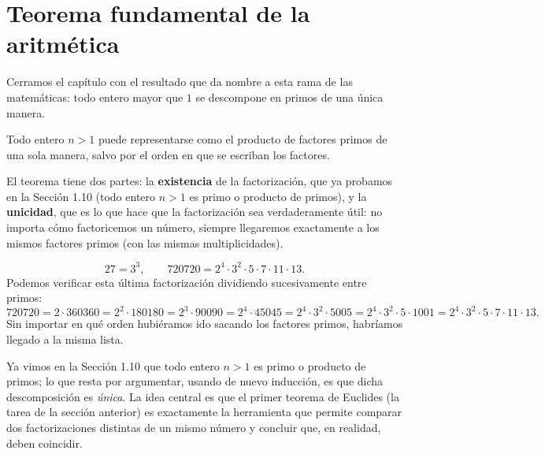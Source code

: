 \documentclass[12pt,a4paper]{book}
\begin{document}
  \section{Teorema fundamental de la aritmética}
  
  Cerramos el capítulo con el resultado que da nombre a esta rama de las matemáticas: todo entero mayor que $1$ se descompone en primos de una única manera.
  
  \begin{teorema}
    Todo entero $n>1$ puede representarse como el producto de factores primos de una sola manera, salvo por el orden en que se escriban los factores.
  \end{teorema}
  
  El teorema tiene dos partes: la \textbf{existencia} de la factorización, que ya probamos en la Sección 1.10 (todo entero $n>1$ es primo o producto de primos), y la \textbf{unicidad}, que es lo que hace que la factorización sea verdaderamente útil: no importa cómo factoricemos un número, siempre llegaremos exactamente a los mismos factores primos (con las mismas multiplicidades).
  
  \begin{ejemplo}
    \begin{equation*}
      27 = 3^3, \qquad 720720 = 2^4\cdot 3^2\cdot 5\cdot 7\cdot 11\cdot 13.
    \end{equation*}
    Podemos verificar esta última factorización dividiendo sucesivamente entre primos:
    \begin{equation*}
      720720 = 2\cdot 360360 = 2^2\cdot 180180 = 2^3\cdot 90090 = 2^4\cdot 45045 = 2^4\cdot 3^2\cdot 5005 = 2^4\cdot 3^2\cdot 5\cdot 1001 = 2^4\cdot 3^2\cdot 5\cdot 7\cdot 11\cdot 13.
    \end{equation*}
    Sin importar en qué orden hubiéramos ido sacando los factores primos, habríamos llegado a la misma lista.
  \end{ejemplo}
  
  Ya vimos en la Sección 1.10 que todo entero $n>1$ es primo o producto de primos; lo que resta por argumentar, usando de nuevo inducción, es que dicha descomposición es \emph{única}. La idea central es que el primer teorema de Euclides (la tarea de la sección anterior) es exactamente la herramienta que permite comparar dos factorizaciones distintas de un mismo número y concluir que, en realidad, deben coincidir.
  
\end{document}
